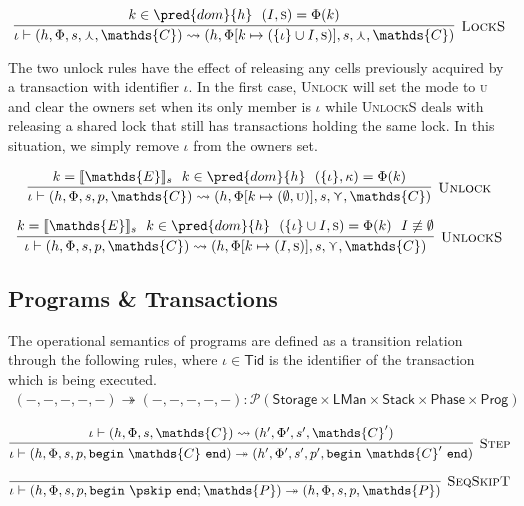 \[
\infer[\textsc{LockS}]
{
	\iota \vdash (h, \Phi, s, \curlywedge, \mathds{C})
	\rightsquigarrow
	(h, \Phi[k \mapsto (\{\iota\} \cup I, \textsc{s})], s, \curlywedge, \mathds{C})
}
{
	k \in \pred{dom}{h}\ \
	(I, \textsc{s}) = \Phi(k)
}
\]

The two unlock rules have the effect of releasing any cells previously acquired by a transaction with identifier $\iota$. In the first case, \textsc{Unlock} will set the mode to \textsc{u} and clear the owners set when its only member is $\iota$ while \textsc{UnlockS} deals with releasing a shared lock that still has transactions holding the same lock. In this situation, we simply remove $\iota$ from the owners set.

\[
\infer[\textsc{Unlock}]
{
	\iota \vdash (h, \Phi, s, p, \mathds{C})
	\rightsquigarrow
	(h, \Phi[k \mapsto (\emptyset, \textsc{u})], s, \curlyvee, \mathds{C})
}
{
	k = \llbracket \mathds{E} \rrbracket_s\ \
	k \in \pred{dom}{h}\ \
	(\{\iota\}, \kappa) = \Phi(k)
}
\]

\[
\infer[\textsc{UnlockS}]
{
	\iota \vdash (h, \Phi, s, p, \mathds{C})
	\rightsquigarrow
	(h, \Phi[k \mapsto (I, \textsc{s})], s, \curlyvee, \mathds{C})
}
{
	k = \llbracket \mathds{E} \rrbracket_s\ \
	k \in \pred{dom}{h}\ \
	(\{\iota\} \cup I, \textsc{s}) = \Phi(k)\ \
	I \not\equiv \emptyset
}
\]

\subsection{Programs \& Transactions}
The operational semantics of programs are defined as a transition relation through the following rules, where $\iota \in \mathsf{Tid}$ is the identifier of the transaction which is being executed.
\begin{gather*}
(-, -, -, -, -) \twoheadrightarrow (-, -, -, -, -) : \mathcal{P}(\mathsf{Storage} \times \mathsf{LMan} \times \mathsf{Stack} \times \mathsf{Phase} \times \mathsf{Prog})
\end{gather*}

\[
\infer[\textsc{Step}]
{
	\iota \vdash (h, \Phi, s, p, \mathtt{begin}\ \mathds{C}\ \mathtt{end})
	\twoheadrightarrow
	(h', \Phi', s', p', \mathtt{begin}\ \mathds{C}'\ \mathtt{end})
}
{
	\iota \vdash (h, \Phi, s, \mathds{C})
	\rightsquigarrow
	(h', \Phi', s', \mathds{C}')
}
\]

\[
\infer[\textsc{SeqSkipT}]
{
	\iota \vdash (h, \Phi, s, p, \mathtt{begin}\ \pskip\ \mathtt{end}; \mathds{P})
	\twoheadrightarrow
	(h, \Phi, s, p, \mathds{P})
}
{}
\]

